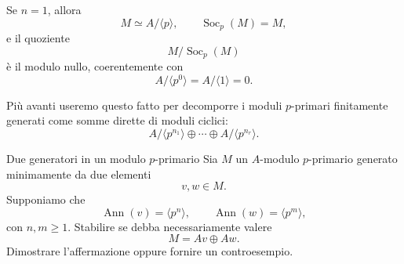 \documentclass[a4paper]{article}
\begin{document}
\begin{radioactive}
\begin{snippetremark}{}
    Se \(n=1\), allora
    \[
        M\simeq A/\langle p \rangle,
        \qquad
        \operatorname{Soc}_p(M)=M,
    \]
    e il quoziente
    \[
        M/\operatorname{Soc}_p(M)
    \]
    è il modulo nullo, coerentemente con
    \[
        A/\langle p^{0} \rangle=A/\langle 1 \rangle=0.
    \]
\end{snippetremark}
\end{radioactive}

\begin{radioactive}
Più avanti useremo questo fatto per decomporre i moduli \(p\)-primari finitamente generati come somme dirette di moduli ciclici:
\[
    A/\langle p^{n_1} \rangle\oplus\cdots\oplus A/\langle p^{n_r} \rangle.
\]
\end{radioactive}

\begin{radioactive}
\begin{snippetexercise}{Due generatori in un modulo \(p\)-primario}
    Sia \(M\) un \(A\)-modulo \(p\)-primario generato minimamente da due elementi
    \[
        v,w\in M.
    \]
    Supponiamo che
    \[
        \operatorname{Ann}(v)=\langle p^n \rangle,
        \qquad
        \operatorname{Ann}(w)=\langle p^m \rangle,
    \]
    con \(n,m\geq 1\). Stabilire se debba necessariamente valere
    \[
        M=Av\oplus Aw.
    \]
    Dimostrare l'affermazione oppure fornire un controesempio.
\end{snippetexercise}
\end{radioactive}
\end{document}

